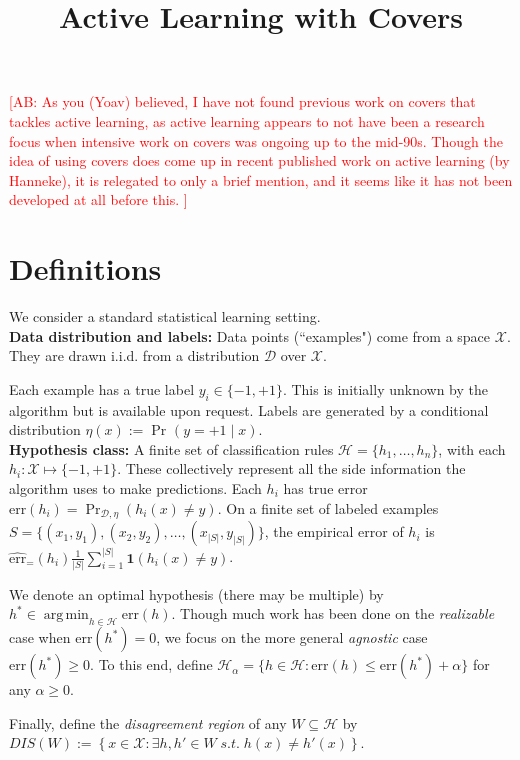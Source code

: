 \documentclass{article}[12pt]
\title{Active Learning with Covers}
\newcommand{\authcmt}[2]{\ifnum\Comments=1\textcolor{#1}{#2}\fi}
\newcommand{\akshay}[1]{\authcmt{red}      {[AB: #1]}}
\theoremstyle{named}
\DeclareMathOperator*{\argmin}{arg\,min}
\DeclareMathOperator{\Prtxt}{Pr}
\newcommand{\ifn}{\mathbf{1}} %
\newcommand{\abs}[1]{\left| #1 \right|}
\newcommand{\prp}[2]{\Prtxt_{#2} \left(#1\right)}
\newcommand{\err}[1]{\mbox{err}\left(#1\right)}
\newcommand{\emperr}[2]{\widehat{\mbox{err}}_{#2} \left(#1\right)}
\newcommand{\cH}{\mathcal{H}}
\newcommand{\cX}{\mathcal{X}}
\newcommand{\cD}{\mathcal{D}}
\begin{document}
\maketitle


\akshay{
As you (Yoav) believed, I have not found previous work on covers that tackles active learning, 
as active learning appears to 
not have been a research focus when intensive work on covers was ongoing up to the mid-90s. 
Though the idea of using covers does come up in recent published work on active learning (by Hanneke), 
it is relegated to only a brief mention, and it seems like it has not been developed at all before this. }

\section{Definitions}

We consider a standard statistical learning setting. \\

{\bf Data distribution and labels:} 
Data points (``examples") come from a space $\cX$. 
They are drawn i.i.d. from a distribution $\cD$ over $\cX$. 

Each example has a true label $y_i \in \{-1, +1\}$. 
This is initially unknown by the algorithm but is available upon request. 
Labels are generated by a conditional distribution $\eta (x) := \prp{y = +1 \mid x}{}$. \\

  
{\bf Hypothesis class:} 
A finite set of classification rules
$\cH= \{ h_1,\ldots, h_n \}$, with each $h_i : \cX \mapsto \{-1,+1\}$.
These collectively represent all the side information the algorithm uses to make predictions. 
Each $h_i$ has true error $\err{h_i} = \prp{h_i (x) \neq y}{\cD, \eta}$. 
On a finite set of labeled examples $S = \{(x_1, y_1), (x_2, y_2), \dots, (x_{\abs{S}}, y_{\abs{S}}) \}$, 
the empirical error of $h_i$ is $\emperr{h_i} = \frac{1}{\abs{S}} \sum_{i=1}^{\abs{S}} \ifn(h_i(x) \neq y)$.
  
We denote an optimal hypothesis (there may be multiple) by 
$h^* \in \argmin_{h \in \cH} \err{h}$. 
Though much work has been done on the \emph{realizable} case when $\err{h^*} = 0$, 
we focus on the more general \emph{agnostic} case $\err{h^*} \geq 0$. 
To this end, define $\cH_{\alpha} = \{ h \in \cH : \err{h} \leq \err{h^*} + \alpha \}$ for any $\alpha \geq 0$.

Finally, define the \emph{disagreement region} of any $W \subseteq \cH$ by 
$DIS(W) := \left\{ x \in \cX : \exists h, h' \in W \;s.t.\; h(x) \neq h'(x) \right\}$. \\
\end{document}
